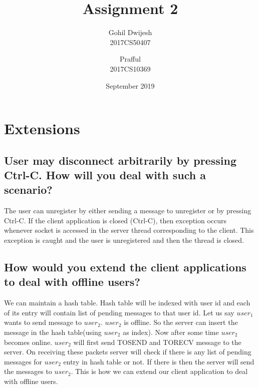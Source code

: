 \documentclass{article}
\title{Assignment 2}
\author{Gohil Dwijesh \\ 2017CS50407
        \and Prafful \\ 2017CS10369}
\date{September 2019}
\begin{document}
\maketitle
\section{Extensions}
    \subsection{User may disconnect arbitrarily by pressing Ctrl-C. How will you deal with such a scenario?}
    The user can unregister by either sending a  message to unregister or by pressing Ctrl-C. If the client application is closed (Ctrl-C), then exception occurs whenever socket is accessed in the server thread corresponding to the client. This exception is caught and the user is unregistered and then the thread is closed.
    \subsection{How would you extend the client applications to deal with offline users?}
    We can maintain a hash table. Hash table will be indexed with user id and each of its entry will contain list of pending messages to that user id. Let us say $user_{1}$ wants to send message to $user_{2}$. $user_{2}$ is offline. So the server can insert the message in the hash table(using $user_{2}$ as index). Now after some time $user_{2}$ becomes online. $user_{2}$ will first send TOSEND and TORECV message to the server. On receiving these packets server will check if there is any list of pending messages for $user_{2}$ entry in hash table or not. If there is then the server will send the messages to $user_{2}$. This is how we can extend our client application to deal with offline users.
\end{document}

